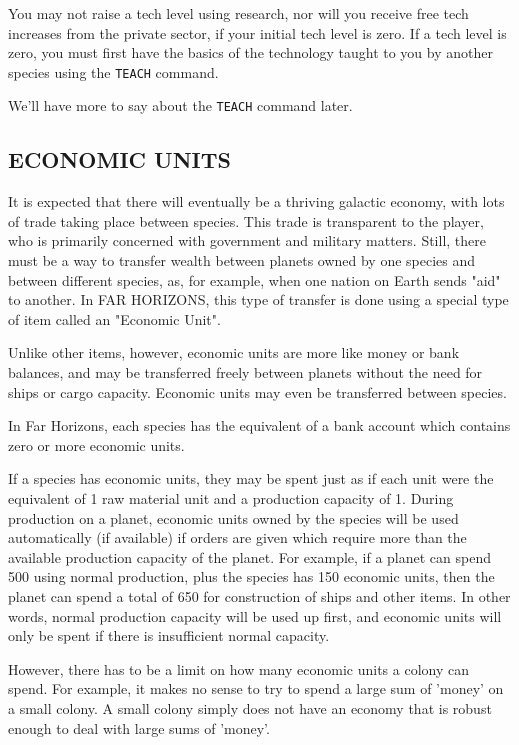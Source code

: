 \documentclass[10pt,titlepage]{article}
\begin{document}
\begin{importantnote}
	You may not raise a tech level using research, nor will you
	receive free tech increases from the private sector, if your
	initial tech level is zero.  If a tech level is zero, you
	must first have the basics of the technology taught to you
	by another species using the \texttt{TEACH} command.
\end{importantnote}

\noindent We'll have more to say about the \texttt{TEACH} command later.


\subsection{ECONOMIC UNITS}
\label{sec:economicunits}


It is expected that there will eventually be a thriving galactic economy, with
lots of trade taking place between species.  This trade is transparent to
the player, who is primarily concerned with government and military matters.
Still, there must be a way to transfer wealth between planets owned by one
species and between different species, as, for example, when one nation on
Earth sends "aid" to another.  In FAR HORIZONS, this type of transfer is
done using a special type of item called an "Economic Unit".

Unlike other items, however, economic units are more like money or bank
balances, and may be transferred freely between planets without the need for
ships or cargo capacity.  Economic units may even be transferred between
species.

In Far Horizons, each species has the equivalent of a bank account which
contains zero or more economic units.

If a species has economic units, they may be spent just as if each unit were
the equivalent of 1 raw material unit and a production capacity of 1.  During
production on a planet, economic units owned by the species will be used
automatically (if available) if orders are given which require more than the
available production capacity of the planet.  For example, if a planet can
spend 500 using normal production, plus the species has 150 economic units,
then the planet can spend a total of 650 for construction of ships and other
items.  In other words, normal production capacity will be used up first, and
economic units will only be spent if there is insufficient normal capacity.

However, there has to be a limit on how many economic units a colony can spend.
For example, it makes no sense to try to spend a large sum of 'money' on a
small colony.  A small colony simply does not have an economy that is robust
enough to deal with large sums of 'money'.
\end{document}
